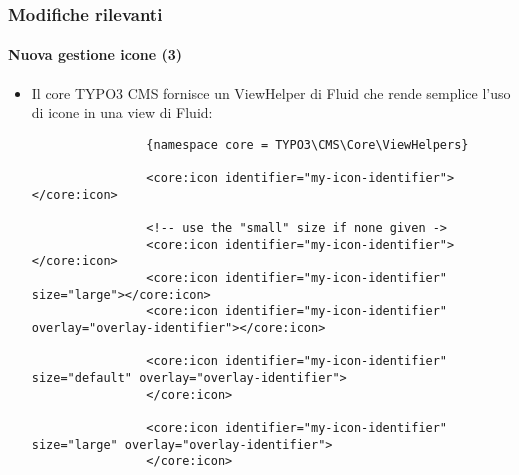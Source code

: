 \begin{frame}[fragile]
	\frametitle{Modifiche rilevanti}
	\framesubtitle{Nuova gestione icone (3)}

	\lstset{basicstyle=\tiny\ttfamily}

	\begin{itemize}

		\item Il core TYPO3 CMS fornisce un ViewHelper di Fluid che rende semplice l'uso di icone in una view di Fluid:

			\begin{lstlisting}
				{namespace core = TYPO3\CMS\Core\ViewHelpers}

				<core:icon identifier="my-icon-identifier"></core:icon>

				<!-- use the "small" size if none given ->
				<core:icon identifier="my-icon-identifier"></core:icon>
				<core:icon identifier="my-icon-identifier" size="large"></core:icon>
				<core:icon identifier="my-icon-identifier" overlay="overlay-identifier"></core:icon>

				<core:icon identifier="my-icon-identifier" size="default" overlay="overlay-identifier">
				</core:icon>

				<core:icon identifier="my-icon-identifier" size="large" overlay="overlay-identifier">
				</core:icon>
			\end{lstlisting}

	\end{itemize}

\end{frame}


